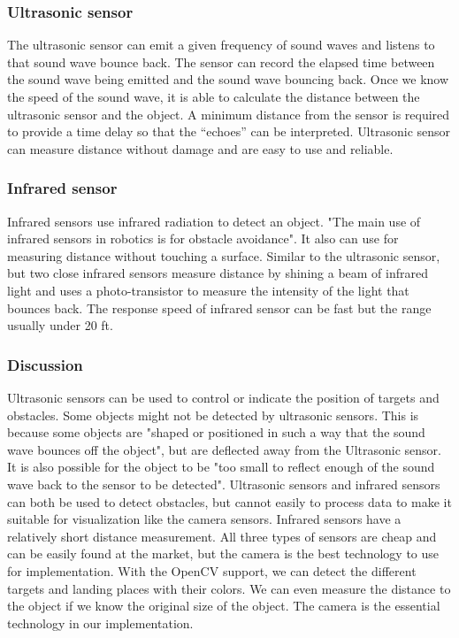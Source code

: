 \documentclass[onecolumn, draftclsnofoot,10pt, compsoc]{IEEEtran}
\begin{document}
\subsubsection{Ultrasonic sensor}
The ultrasonic sensor can emit a given frequency of sound waves and listens to that sound wave bounce back. The sensor can record the elapsed time between the sound wave being emitted and the sound wave bouncing back. Once we know the speed of the sound wave, it is able to calculate the distance between the ultrasonic sensor and the object. A minimum distance from the sensor is required to provide a time delay so that the “echoes” can be interpreted. \cite{r32} Ultrasonic sensor can measure distance without damage and are easy to use and reliable. 

\subsubsection{Infrared sensor}
Infrared sensors use infrared radiation to detect an object. "The main use of infrared sensors in robotics is for obstacle avoidance".\cite{r16} It also can use for measuring distance without touching a surface. Similar to the ultrasonic sensor, but two close infrared sensors measure distance by shining a beam of infrared light and uses a photo-transistor to measure the intensity of the light that bounces back. The response speed of infrared sensor can be fast but the range usually under 20 ft.

\subsubsection{Discussion}
Ultrasonic sensors can be used to control or indicate the position of targets and obstacles. Some objects might not be detected by ultrasonic sensors. This is because some objects are "shaped or positioned in such a way that the sound wave bounces off the object", but are deflected away from the Ultrasonic sensor. It is also possible for the object to be "too small to reflect enough of the sound wave back to the sensor to be detected"\cite{r11}. Ultrasonic sensors and infrared sensors can both be used to detect obstacles, but cannot easily to process data to make it suitable for visualization like the camera sensors. Infrared sensors have a relatively short distance measurement. All three types of sensors are cheap and can be easily found at the market, but the camera is the best technology to use for implementation. With the OpenCV support, we can detect the different targets and landing places with their colors. We can even measure the distance to the object if we know the original size of the object. The camera is the essential technology in our implementation.
\end{document}
